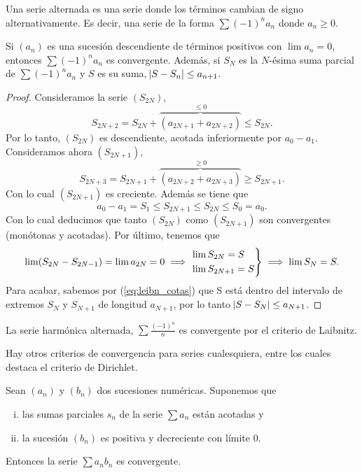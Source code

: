 \begin{defi}
    Una serie alternada es una serie donde los términos cambian de signo alternativamente.
    Es decir, una serie de la forma $\sum (-1)^n a_n$ donde $a_n \geq 0$.
\end{defi}

\begin{prop}
    Si $(a_n)$ es una sucesión descendiente de términos positivos con $\lim a_n = 0$,
    entonces  $\sum (-1)^n a_n$ es convergente. Además, si $S_N$ es la $N$-ésima suma
    parcial de $\sum (-1)^n a_n$ y $S$ es su suma, $\abs{S - S_n} \leq a_{n+1}$.
\end{prop}

\begin{proof}
    Consideramos la serie $(S_{2N})$,
    \[
        S_{2N+2} = S_{2N} + \overbrace{(a_{2N+1} + a_{2N+2})}^{\leq 0} \leq S_{2N}.
    \]
    Por lo tanto, $(S_{2N})$ es descendiente, acotada inferiormente por $a_0 - a_1$.
    Consideramos ahora $(S_{2N+1})$,
    \[
        S_{2N+3} = S_{2N+1} + \overbrace{(a_{2N+2} + a_{2N+3})}^{\geq 0} \geq S_{2N+1}.
    \]
    Con lo cual $(S_{2N+1})$ es creciente. Además se tiene que
    \begin{equation}\label{eq:leibn_cotas}
        a_0 - a_1 = S_1 \leq S_{2N+1} \leq S_{2N} \leq S_0 = a_0.
    \end{equation}
    Con lo cual deducimos que tanto $(S_{2N})$ como $(S_{2N+1})$ son convergentes
    (monótonas y acotadas). Por último, tenemos que
    \[
        \lim (S_{2N} - S_{2N-1}) = \lim a_{2N} = 0 \implies \begin{rcases}
            \lim S_{2N} = S \\ \lim S_{2N+1} = S
        \end{rcases} \implies \lim S_N = S.
    \]
    Para acabar, sabemos por (\ref{eq:leibn_cotas}) que S está dentro del intervalo
    de extremos $S_{N}$ y $S_{N+1}$ de longitud $a_{N+1}$, por lo tanto
    $\abs{S - S_N} \leq a_{N+1}$.
\end{proof}

\begin{example}
    La serie harmónica alternada, $\sum \frac{(-1)^n}{n}$ es convergente por el
    criterio de Laibnitz.
\end{example}

\noindent Hay otros criterios de convergencia para series cualesquiera, entre los cuales
destaca el criterio de Dirichlet.

\begin{prop}
    Sean $(a_n)$ y $(b_n)$ dos sucesiones numéricas. Suponemos que
    \begin{enumerate}[i)]
        \item las sumas parciales $s_n$ de la serie $\sum a_n$ están acotadas y
        \item la sucesión $(b_n)$ es positiva y decreciente con límite 0.
    \end{enumerate}
    Entonces la serie $\sum a_nb_n$ es convergente.
\end{prop}

